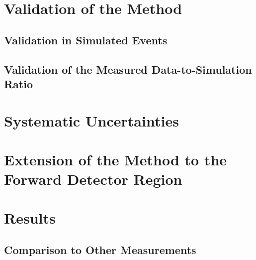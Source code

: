\section{Validation of the Method}
\label{sec:jer_validation}

\subsection{Validation in Simulated Events}
\label{sec:jer_validation_closure}

\subsection{Validation of the Measured Data-to-Simulation Ratio}
\label{sec:jer_validation_ratio}

\section{Systematic Uncertainties}
\label{sec:jer_syst_unc}

\section{Extension of the Method to the Forward Detector Region}
\label{sec:jer_forward_extension}

\section{Results}
\label{sec:jer_results}

\subsection{Comparison to Other Measurements}
\label{subsec:jer_results_comparison}













